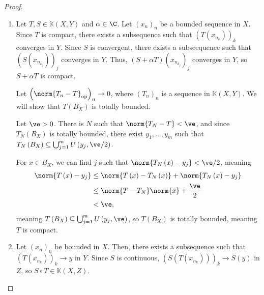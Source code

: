 \documentclass[10pt]{mypackage}
\begin{document}
\begin{proof}\hfill
  \begin{enumerate}[(1)]
    \item Let $T,S\in \mathds{K}\left(X,Y\right)$ and $\alpha \in \C$. Let $\left(x_n\right)_n$ be a bounded sequence in $X$. Since $T$ is compact, there exists a subsequence such that $\left(T\left(x_{n_k}\right)\right)_{k}$ converges in $Y$. Since $S$ is convergent, there exists a subseequence such that $\left(S\left(x_{n_{k_{j}}}\right)\right)_{j}$ converges in $Y$. Thus, $\left(S + \alpha T\right)\left(x_{n_{k_{j}}}\right)_{j}$ converges in $Y$, so $S + \alpha T$ is compact.\newline

      Let $\left(\norm{T_n - T}_{\text{op}}\right)_{n}\rightarrow 0$, where $\left(T_{n}\right)_{n}$ is a sequence in $\mathds{K}\left(X,Y\right)$. We will show that $T\left(B_X\right)$ is totally bounded.\newline

      Let $\ve > 0$. There is $N$ such that $\norm{T_{N} - T} < \ve$, and since $T_{N}\left(B_X\right)$ is totally bounded, there exist $y_{1},\dots,y_m$ such that $T_{N}\left(B_{X}\right)\subseteq \bigcup_{j=1}^{m}U\left(y_j,\ve/2\right)$.\newline

      For $x\in B_X$, we can find $j$ such that $\norm{T_{N}\left(x\right) - y_j} < \ve/2$, meaning
      \begin{align*}
        \norm{T\left(x\right) - y_j} &\leq \norm{T\left(x\right) - T_{N}\left(x\right)} + \norm{T_{N}\left(x\right) - y_j}\\
                                     &\leq \norm{T - T_N}\norm{x} + \frac{\ve}{2}\\
                                     &< \ve,
      \end{align*}
      meaning $T\left(B_{X}\right)\subseteq \bigcup_{j=1}^{m}U\left(y_j,\ve\right)$, so $T\left(B_X\right)$ is totally bounded, meaning $T$ is compact.
    \item Let $\left(x_n\right)_n$ be bounded in $X$. Then, there exists a subsequence such that $\left(T\left(x_{n_k}\right)\right)_{k}\rightarrow y$ in $Y$. Since $S$ is continuous, $\left(S\left(T\left(x_{n_{k}}\right)\right)\right)_{k}\rightarrow S(y)$ in $Z$, so $S\circ T\in \mathds{K}\left(X,Z\right)$.\newline


\end{enumerate}
\end{proof}
\end{document}
